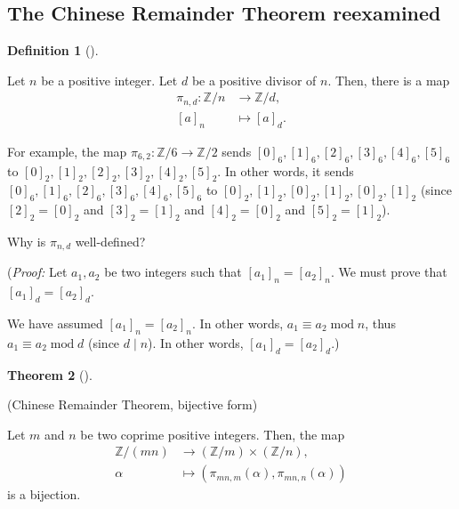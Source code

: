 \documentclass[numbers=enddot,12pt,final,onecolumn,notitlepage]{scrartcl}%
\numberwithin{exer}{subsection}
\theoremstyle{definition}
\newtheorem{theo}{Theorem}[subsection]
\newenvironment{theorem}[1][]
{\begin{theo}[#1]\begin{leftbar}}
{\end{leftbar}\end{theo}}
\newtheorem{defi}[theo]{Definition}
\newenvironment{definition}[1][]
{\begin{defi}[#1]\begin{leftbar}}
{\end{leftbar}\end{defi}}
\begin{document}
\subsection{The Chinese Remainder Theorem reexamined}

\begin{definition}
Let $n$ be a positive integer. Let $d$ be a positive divisor of $n$. Then,
there is a map%
\begin{align*}
\pi_{n,d}:\mathbb{Z}/n  &  \rightarrow\mathbb{Z}/d,\\
\left[  a\right]  _{n}  &  \mapsto\left[  a\right]  _{d}.
\end{align*}

\end{definition}

For example, the map $\pi_{6,2}:\mathbb{Z}/6\rightarrow\mathbb{Z}/2$ sends
$\left[  0\right]  _{6},\left[  1\right]  _{6},\left[  2\right]  _{6},\left[
3\right]  _{6},\left[  4\right]  _{6},\left[  5\right]  _{6}$ to $\left[
0\right]  _{2},\left[  1\right]  _{2},\left[  2\right]  _{2},\left[  3\right]
_{2},\left[  4\right]  _{2},\left[  5\right]  _{2}$. In other words, it sends
$\left[  0\right]  _{6},\left[  1\right]  _{6},\left[  2\right]  _{6},\left[
3\right]  _{6},\left[  4\right]  _{6},\left[  5\right]  _{6}$ to $\left[
0\right]  _{2},\left[  1\right]  _{2},\left[  0\right]  _{2},\left[  1\right]
_{2},\left[  0\right]  _{2},\left[  1\right]  _{2}$ (since $\left[  2\right]
_{2}=\left[  0\right]  _{2}$ and $\left[  3\right]  _{2}=\left[  1\right]
_{2}$ and $\left[  4\right]  _{2}=\left[  0\right]  _{2}$ and $\left[
5\right]  _{2}=\left[  1\right]  _{2}$).

Why is $\pi_{n,d}$ well-defined?

(\textit{Proof:} Let $a_{1},a_{2}$ be two integers such that $\left[
a_{1}\right]  _{n}=\left[  a_{2}\right]  _{n}$. We must prove that $\left[
a_{1}\right]  _{d}=\left[  a_{2}\right]  _{d}$.

We have assumed $\left[  a_{1}\right]  _{n}=\left[  a_{2}\right]  _{n}$. In
other words, $a_{1}\equiv a_{2}\operatorname{mod}n$, thus $a_{1}\equiv
a_{2}\operatorname{mod}d$ (since $d\mid n$). In other words, $\left[
a_{1}\right]  _{d}=\left[  a_{2}\right]  _{d}$.)

\begin{theorem}
\label{thm.equiv.CRT2}(Chinese Remainder Theorem, bijective form)

Let $m$ and $n$ be two coprime positive integers. Then, the map%
\begin{align*}
\mathbb{Z}/\left(  mn\right)   &  \rightarrow\left(  \mathbb{Z}/m\right)
\times\left(  \mathbb{Z}/n\right)  ,\\
\alpha &  \mapsto\left(  \pi_{mn,m}\left(  \alpha\right)  ,\pi_{mn,n}\left(
\alpha\right)  \right)
\end{align*}
is a bijection.
\end{theorem}
\end{document}

